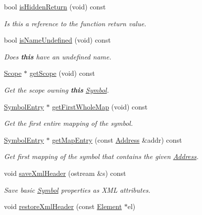 \begin{DoxyCompactItemize}
bool \mbox{\hyperlink{class_symbol_a26be01aae9268f6a20d3c9f467c8302f}{is\+Hidden\+Return}} (void) const
\begin{DoxyCompactList}\small\item\em Is this a reference to the function return value. \end{DoxyCompactList}\item 
bool \mbox{\hyperlink{class_symbol_a9454755130e3ed3980ec3340d1da663e}{is\+Name\+Undefined}} (void) const
\begin{DoxyCompactList}\small\item\em Does {\bfseries{this}} have an undefined name. \end{DoxyCompactList}\item 
\mbox{\hyperlink{class_scope}{Scope}} $\ast$ \mbox{\hyperlink{class_symbol_af2652f9225cfb08f99f0f8c9dca37db1}{get\+Scope}} (void) const
\begin{DoxyCompactList}\small\item\em Get the scope owning {\bfseries{this}} \mbox{\hyperlink{class_symbol}{Symbol}}. \end{DoxyCompactList}\item 
\mbox{\hyperlink{class_symbol_entry}{Symbol\+Entry}} $\ast$ \mbox{\hyperlink{class_symbol_a9176f3c0f44f3373ef092043486a147b}{get\+First\+Whole\+Map}} (void) const
\begin{DoxyCompactList}\small\item\em Get the first entire mapping of the symbol. \end{DoxyCompactList}\item 
\mbox{\hyperlink{class_symbol_entry}{Symbol\+Entry}} $\ast$ \mbox{\hyperlink{class_symbol_a0f86b85ac74fc36f1df80b48b658af1c}{get\+Map\+Entry}} (const \mbox{\hyperlink{class_address}{Address}} \&addr) const
\begin{DoxyCompactList}\small\item\em Get first mapping of the symbol that contains the given \mbox{\hyperlink{class_address}{Address}}. \end{DoxyCompactList}\item 
void \mbox{\hyperlink{class_symbol_a3aad352e6eb26be6cff727b66e86a9d4}{save\+Xml\+Header}} (ostream \&s) const
\begin{DoxyCompactList}\small\item\em Save basic \mbox{\hyperlink{class_symbol}{Symbol}} properties as X\+ML attributes. \end{DoxyCompactList}\item 
void \mbox{\hyperlink{class_symbol_aa566c1619067211810c030f5e15f69e3}{restore\+Xml\+Header}} (const \mbox{\hyperlink{class_element}{Element}} $\ast$el)

\end{DoxyCompactItemize}

